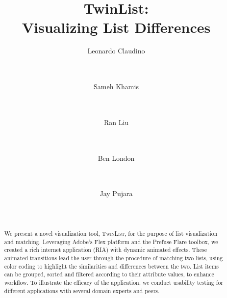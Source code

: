 \documentclass{chi2009}
\newcommand{\TwinList}{\textsc{TwinList}}
\begin{document}
\setlength{\paperheight}{11in}
\setlength{\paperwidth}{8.5in}
\setlength{\pdfpageheight}{\paperheight}
\setlength{\pdfpagewidth}{\paperwidth}


\title{TwinList: \\ Visualizing List Differences}
\author{
  \alignauthor Leonardo Claudino \\
    \\
    \\
  \and
  \alignauthor Sameh Khamis\\
    \\
    \\
  \and
  \alignauthor Ran Liu \\
    \\
    \\
  \and
  \alignauthor Ben London \\
    \\
    \\
  \and
  \alignauthor Jay Pujara \\
    \\
    \\
}

\maketitle

\begin{abstract}
We present a novel visualization tool, \TwinList, for the purpose of list visualization and matching. Leveraging Adobe's Flex platform and the Prefuse Flare toolbox, we created a rich internet application (RIA) with dynamic animated effects. These animated transitions lead the user through the procedure of matching two lists, using color coding to highlight the similarities and differences between the two. List items can be grouped, sorted and filtered according to their attribute values, to enhance workflow. To illustrate the efficacy of the application, we conduct usability testing for different applications with several domain experts and peers.
\end{abstract}
\end{document}
